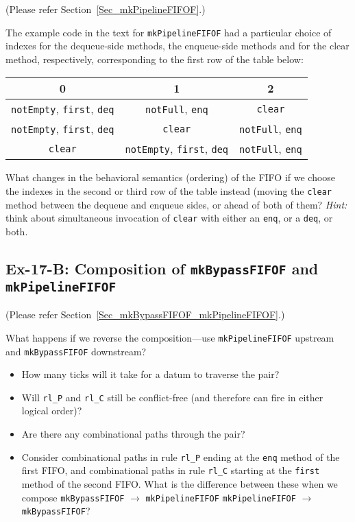 (Please refer Section~\ref{Sec_mkPipelineFIFOF}.)

The example code in the text for {\tt mkPipelineFIFOF} had a
particular choice of indexes for the dequeue-side methods, the
enqueue-side methods and for the clear method, respectively,
corresponding to the first row of the table below:

\begin{center}
\begin{tabular}{|c|c|c|}
\hline
    0  &  1  &  2 \\
\hline
  {\tt notEmpty}, {\tt first}, {\tt deq}  &
  {\tt notFull}, {\tt enq} &
  {\tt clear} \\
\hline
  {\tt notEmpty}, {\tt first}, {\tt deq} &
  {\tt clear} &
  {\tt notFull}, {\tt enq} \\
\hline
  {\tt clear} &
  {\tt notEmpty}, {\tt first}, {\tt deq} &
  {\tt notFull}, {\tt enq} \\
\hline
\end{tabular}
\end{center}

What changes in the behavioral semantics (ordering) of the FIFO if we
choose the indexes in the second or third row of the table instead
(moving the {\tt clear} method between the dequeue and enqueue sides,
or ahead of both of them?  \emph{Hint:} think about simultaneous
invocation of {\tt clear} with either an {\tt enq}, or a {\tt deq}, or
both.


\subsection*{Ex-17-B: Composition of {\tt mkBypassFIFOF} and {\tt mkPipelineFIFOF}}
\label{Ex-17-B-Pipeline-FIFO-Composition}

(Please refer Section~\ref{Sec_mkBypassFIFOF_mkPipelineFIFOF}.)

What happens if we reverse the composition---use
\verb|mkPipelineFIFOF| upstream and \verb|mkBypassFIFOF| downstream?

\begin{itemize}

 \item How many ticks will it take for a datum to traverse the pair?

 \item Will \verb|rl_P| and \verb|rl_C| still be conflict-free (and
       therefore can fire in either logical order)?

 \item Are there any combinational paths through the pair?

 \item Consider combinational paths in rule \verb|rl_P| ending at the
       \verb|enq| method of the first FIFO, and combinational paths in
       rule \verb|rl_C| starting at the \verb|first| method of the
       second FIFO.  What is the difference between these when we
       compose \verb|mkBypassFIFOF| $\longrightarrow$ \verb|mkPipelineFIFOF|
       {\vs} \verb|mkPipelineFIFOF| $\longrightarrow$ \verb|mkBypassFIFOF|?

\end{itemize}


